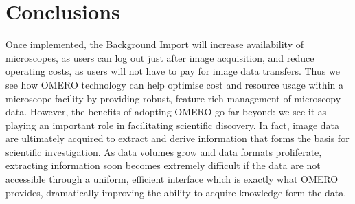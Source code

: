 \section{Conclusions}
Once implemented, the Background Import will increase availability of microscopes,
as users can log out just after image acquisition, and reduce operating costs, as
users will not have to pay for image data transfers. 
Thus we see how OMERO technology can help optimise cost and resource usage within a 
microscope facility by providing robust, feature-rich management of microscopy data. 
However, the benefits of adopting OMERO go far beyond: we see it as playing an important
role in facilitating scientific discovery. In fact, image data are ultimately acquired
to extract and derive information that forms the basis for scientific investigation. 
As data volumes grow and data formats proliferate, extracting information soon becomes
extremely difficult if the data are not accessible through a uniform, efficient 
interface which is exactly what OMERO provides, dramatically improving the ability 
to acquire knowledge form the data. 
